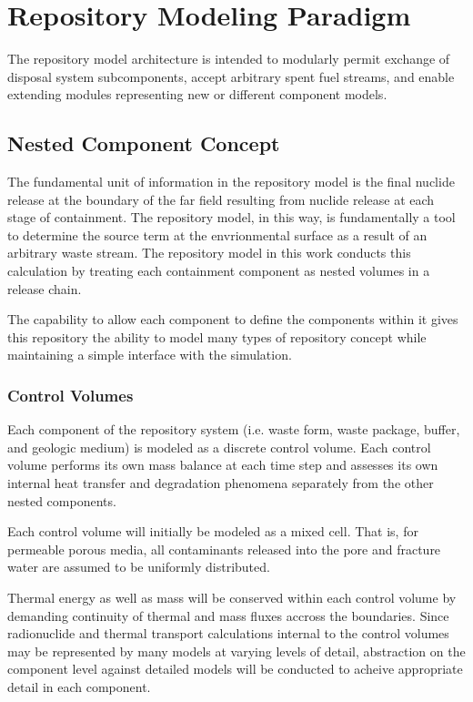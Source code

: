 \section{Repository Modeling Paradigm}

The repository model architecture is intended to modularly permit 
exchange of disposal system subcomponents, accept arbitrary spent fuel 
streams, and enable extending modules representing new or different 
component models.

\subsection{Nested Component Concept}

The fundamental unit of information in the repository model is the final nuclide  
release at the boundary of the far field resulting from nuclide release at 
each stage of containment.  The repository model, in this way, is fundamentally 
a tool to determine the source term at the envrionmental surface as a result 
of an arbitrary waste stream. The repository model in this work conducts this 
calculation by  treating each containment component as nested volumes in a 
release chain. 

The capability to allow each component to define the components within it 
gives this repository the ability to model many types of repository concept 
while maintaining a simple interface with the simulation. 

\subsubsection{Control Volumes}

Each component of the repository system (i.e. waste form, waste package, buffer, 
and geologic medium) is modeled as a discrete control volume. Each control 
volume performs its own mass balance at each time step and assesses its own 
internal  heat transfer and degradation phenomena separately from the other 
nested components.

Each control volume will initially be modeled as a mixed cell. That is, for 
permeable porous media, all contaminants released into the pore and fracture 
water are assumed to be uniformly distributed.

Thermal energy as well as mass will be conserved within each control volume by 
demanding continuity of thermal and mass fluxes accross the boundaries. Since 
radionuclide and thermal transport calculations internal to the control volumes  
may be represented by many models at varying levels of detail, abstraction on 
the component level against detailed models will be conducted to acheive 
appropriate detail in each component. 

